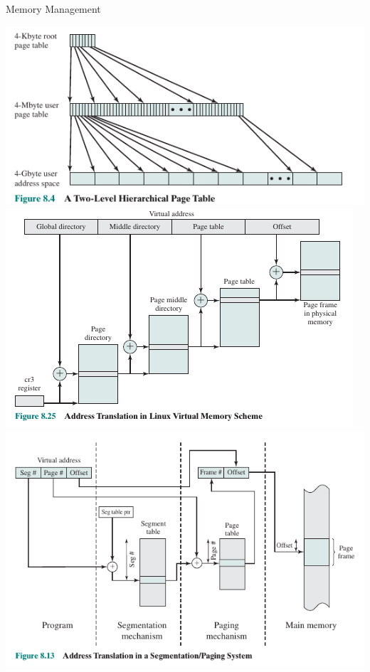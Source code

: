 \documentclass[10pt]{beamer}
\begin{document}
\begin{frame}[allowframebreaks]{Memory Management}
\begin{center}
    \includegraphics[keepaspectratio, width=\textwidth, height=\textheight-2\baselineskip-2\baselineskip]{img/012_page_table.png} \\ \framebreak
    \includegraphics[keepaspectratio, width=\textwidth, height=\textheight-2\baselineskip-2\baselineskip]{img/012_paging_linux.png} \\ \framebreak
    \includegraphics[keepaspectratio, width=\textwidth, height=\textheight-2\baselineskip-2\baselineskip]{img/012_paging_seg.png} \\
 \end{center}
\end{frame}
\end{document}

